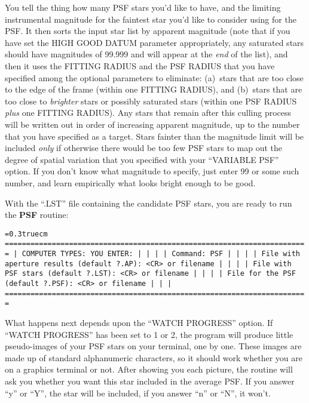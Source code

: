 You tell the thing how many PSF stars you'd like to have, and the
limiting instrumental magnitude for the faintest star you'd like to
consider using for the PSF.  It then sorts the input star list by
apparent magnitude (note that if you have set the HIGH GOOD DATUM
parameter appropriately, any saturated stars should have magnitudes of
99.999 and will appear at the {\it end\/} of the list), and then it
uses the FITTING RADIUS and the PSF RADIUS that you have specified
among the optional parameters to eliminate:  (a)~stars that are too
close to the edge of the frame (within one FITTING RADIUS), and
(b)~stars that are too close to {\it brighter\/} stars or possibly
saturated stars (within one PSF RADIUS {\it plus\/} one FITTING
RADIUS).  Any stars that remain after this culling process will be
written out in order of increasing apparent magnitude, up to the number
that you have specified as a target.  Stars fainter than the magnitude
limit will be included {\it only\/} if otherwise there would be too
few PSF stars to map out the degree of spatial variation that you
specified with your ``VARIABLE PSF'' option.  If you don't know what
magnitude to specify, just enter 99 or some such number, and learn
empirically what looks bright enough to be good.

With the ``.LST'' file containing the candidate PSF stars, you are
ready to run the {\bf PSF} routine:

\bigskip
{\noindent\obeylines\obeyspaces\frenchspacing\tt\baselineskip=0.3truecm
=======================================================================
| COMPUTER TYPES:                                  YOU ENTER:         |
|                                                                     |
| Command:                                         PSF                |
|                                                                     |
|  File with aperture results (default ?.AP):      <CR> or filename   |
|                                                                     |
|        File with PSF stars (default ?.LST):      <CR> or filename   |
|                                                                     |
|           File for the PSF (default ?.PSF):      <CR> or filename   |
|                                                                     |
=======================================================================
}
\bigskip

What happens next depends upon the ``WATCH PROGRESS'' option.  If
``WATCH PROGRESS'' has been set to 1 or 2, the program will produce
little pseudo-images of your PSF stars on your terminal, one by one.
These images are made up of standard alphanumeric characters, so it
should work whether you are on a graphics terminal or not.  After
showing you each picture, the routine will ask you whether you want
this star included in the average PSF.  If you answer ``y'' or ``Y'',
the star will be included, if you answer ``n'' or ``N'', it won't.

